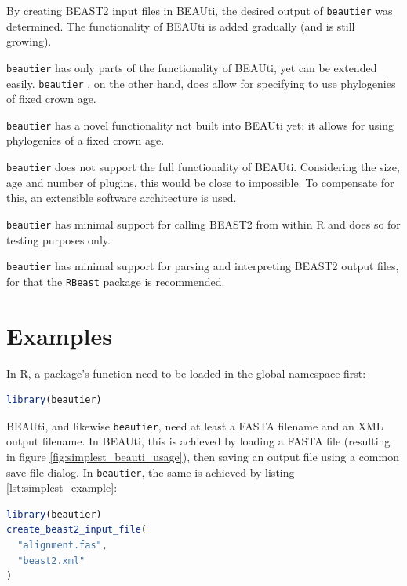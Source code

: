 \documentclass{article}
\begin{document}
By creating BEAST2 input files in BEAUti, 
the desired output of \verb;beautier; was determined. 
The functionality of BEAUti is added gradually (and is still growing).

\verb;beautier; has only parts of the functionality of BEAUti, yet
can be extended easily. \verb;beautier; , on the other hand, does allow for specifying
to use phylogenies of fixed crown age.

\verb;beautier; has a novel functionality not built into BEAUti yet:
it allows for using phylogenies of a fixed crown age. 

\verb;beautier; does not support the full functionality of BEAUti. Considering
the size, age and number of plugins, this would be close to impossible.
To compensate for this, an extensible software architecture is used.

\verb;beautier; has minimal support for calling BEAST2 from within R and does
so for testing purposes only. 

\verb;beautier; has minimal support for parsing and interpreting BEAST2 output files,
for that the \verb;RBeast; \cite{RBeast} package is recommended.

\section{Examples}

In R, a package's function need to be loaded in the global namespace first:

\begin{lstlisting}[language=R, caption=Loading, label=lst:loading_beautier, floatplacement=H]
library(beautier)
\end{lstlisting}

BEAUti, and likewise \verb;beautier;, need at least a FASTA filename
and an XML output filename. In BEAUti, this is achieved by loading a FASTA file (resulting
in figure \ref{fig:simplest_beauti_usage}), then saving an output file using a common
save file dialog. In \verb;beautier;, the same is achieved by listing \ref{lst:simplest_example}:

\begin{lstlisting}[language=R, caption=Simplest example, label=lst:simplest_example, floatplacement=H]
library(beautier)
create_beast2_input_file(
  "alignment.fas",
  "beast2.xml"
)
\end{lstlisting}
\end{document}
